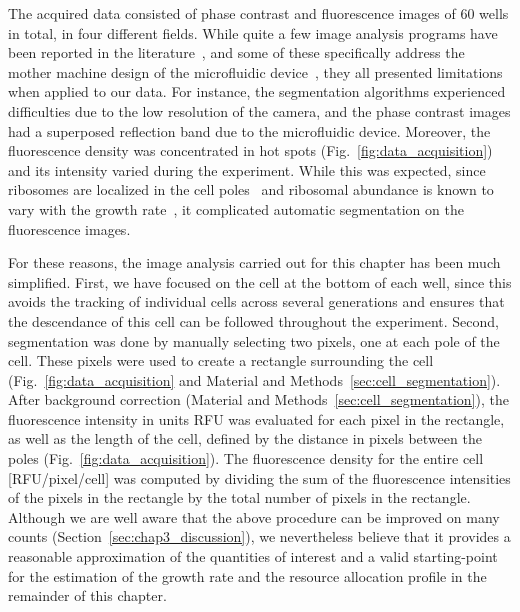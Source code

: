 The acquired data consisted of phase contrast and fluorescence images of 60 wells in total, in four different fields.
While quite a few image analysis programs have been reported in the literature~\cite{klein_tlm-tracker:_2012,wang_image_2010,young_measuring_2012,paintdakhi_oufti:_2016}, and some of these specifically address the mother machine design of the microfluidic device~\cite{wang_robust_2010,sachs_image-based_2016}, they all presented limitations when applied to our data.
For instance, the segmentation algorithms experienced difficulties due to the low resolution of the camera, and the phase contrast images had a superposed reflection band due to the microfluidic device.
Moreover, the fluorescence density was concentrated in hot spots (Fig.~\ref{fig:data_acquisition}) and its intensity varied during the experiment. 
While this was expected, since ribosomes are localized in the cell poles~\cite{bakshi_superresolution_2012} and ribosomal abundance is known to vary with the growth rate~\cite{scott_interdependence_2010}, it complicated automatic segmentation on the fluorescence images.

For these reasons, the image analysis carried out for this chapter has been much simplified. 
First, we have focused on the cell at the bottom of each well, since this avoids the tracking of individual cells across several generations and ensures that the descendance of this cell can be followed throughout the experiment.
Second, segmentation was done by manually selecting two pixels, one at each pole of the cell.
These pixels were used to create a rectangle surrounding the cell (Fig.~\ref{fig:data_acquisition} and Material and Methods~\ref{sec:cell_segmentation}).
After background correction (Material and Methods~\ref{sec:cell_segmentation}), the fluorescence intensity in units RFU was evaluated for each pixel in the rectangle, as well as the length of the cell, defined by the distance in pixels between the poles (Fig.~\ref{fig:data_acquisition}).
The fluorescence density for the entire cell [RFU/pixel/cell] was computed by dividing the sum of the fluorescence intensities of the pixels in the rectangle by the total number of pixels in the rectangle.
Although we are well aware that the above procedure can be improved on many counts (Section~\ref{sec:chap3_discussion}), we nevertheless believe that it provides a reasonable approximation of the quantities of interest and a valid starting-point for the estimation of the growth rate and the resource allocation profile in the remainder of this chapter.   


